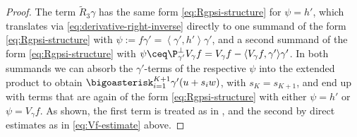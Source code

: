 \begin{proof}
The term $ \widetilde{R}_{3}\gamma $ has the {same form \cref{eq:Rgpsi-structure} for $ \psi=h' $,} which translates via \cref{eq:derivative-right-inverse} directly to one summand of the form \cref{eq:Rgpsi-structure} with $ \psi:=f\gamma'=\left\langle \gamma',h' \right\rangle \gamma' $, and a second summand of the form \cref{eq:Rgpsi-structure} with $ \psi\ceq \P^{\perp}_{\gamma'}V_\gamma f=V_\gamma f-\langle V_\gamma f,\gamma' \rangle \gamma'$. In both summands we can absorb the $ \gamma' $-terms of the respective $ \psi $ into the extended product to obtain $ \bigoasterisk_{i=1}^{K+1}\gamma'(u+s_i w) $, with $ s_K=s_{K+1} $, and end up with terms that are again of the form \cref{eq:Rgpsi-structure} with either $ \psi=h' $ or $ \psi=V_{\gamma}f$. As shown, the first term is treated as in \cite[Proposition 4.3]{blatt-reiter_2015a}, and the second by direct estimates as in \cref{eq:Vf-estimate} above. 


\end{proof}
